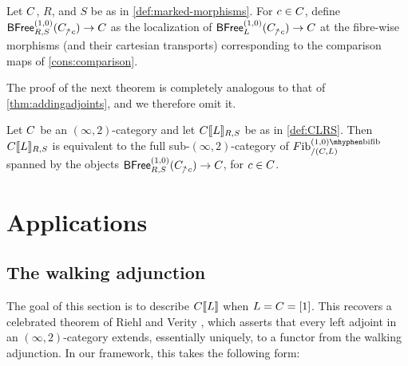 \documentclass[a4paper,reqno,twoside]{amsart}
\begin{document}
\begin{definition}\label{def:representableRS}
	Let $\relax{C}$, $R$, and $S$ be as in \cref{def:marked-morphisms}. For $c \in \relax{C}$, define $\BFree^{(1,0)}_{R,S}(\cC_{\upslash c}) \to \cC$ as the localization of $\BFree^{(1,0)}_{\cL}(\cC_{\upslash c}) \to \cC$ at the fibre-wise morphisms (and their cartesian transports) corresponding to the comparison maps of \cref{cons:comparison}.
\end{definition}

The proof of the next theorem is completely analogous to that of \cref{thm:addingadjoints}, and we therefore omit it.

\begin{theorem}\label{thm:fibmodelRS}
	Let $\relax{C}$ be an $(\infty,2)$-category and let $\relax{C}[\![\relax{L}]\!]_{R,S}$ be as in \cref{def:CLRS}. Then $\relax{C}[\![\relax{L}]\!]_{R,S}$ is equivalent to the full sub-$(\infty,2)$-category of $\Fib^{(1,0)\mhyphen\bifib}_{/(\cC,\cL)}$ spanned by the objects $\BFree^{(1,0)}_{R,S}(\cC_{\upslash c}) \to \cC$, for $c \in \relax{C}$.
\end{theorem}































\section{Applications}

\subsection{The walking adjunction}\label{sec:walkingadjunction}
The goal of this section is to describe $\relax{C}[\![\relax{L}]\!]$ when $\relax{L}=\relax{C}=[1]$. This recovers a celebrated theorem of Riehl and Verity \cite{RiehlVerity2016FormalTheoryMonads}, which asserts that every left adjoint in an $(\infty,2)$-category extends, essentially uniquely, to a functor from the walking adjunction. In our framework, this takes the following form:
\end{document}
